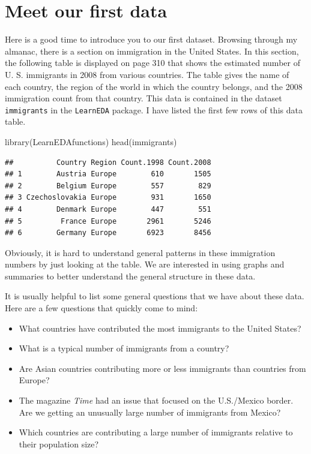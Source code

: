 \documentclass[
]{book}
\newenvironment{Shaded}{\begin{snugshade}}{\end{snugshade}}
\newcommand{\FunctionTok}[1]{\textcolor[rgb]{0.00,0.00,0.00}{#1}}
\newcommand{\NormalTok}[1]{#1}
\providecommand{\tightlist}{%
  \setlength{\itemsep}{0pt}\setlength{\parskip}{0pt}}
\begin{document}
\hypertarget{meet-our-first-data}{%
\section{Meet our first data}\label{meet-our-first-data}}

Here is a good time to introduce you to our first dataset. Browsing through my almanac, there is a section on immigration in the United States. In this section, the following table is displayed on page 310 that shows the estimated number of U. S. immigrants in 2008 from various countries. The table gives the name of each country, the region of the world in which the country belongs, and the 2008 immigration count from that country. This data is contained in the dataset \texttt{immigrants} in the \texttt{LearnEDA} package. I have listed the first few rows of this data table.

\begin{Shaded}
\begin{Highlighting}[]
\FunctionTok{library}\NormalTok{(LearnEDAfunctions)}
\FunctionTok{head}\NormalTok{(immigrants)}
\end{Highlighting}
\end{Shaded}

\begin{verbatim}
##          Country Region Count.1998 Count.2008
## 1        Austria Europe        610       1505
## 2        Belgium Europe        557        829
## 3 Czechoslovakia Europe        931       1650
## 4        Denmark Europe        447        551
## 5         France Europe       2961       5246
## 6        Germany Europe       6923       8456
\end{verbatim}

Obviously, it is hard to understand general patterns in these immigration numbers by just looking at the table. We are interested in using graphs and summaries to better understand the general structure in these data.

It is usually helpful to list some general questions that we have about these data. Here are a few questions that quickly come to mind:

\begin{itemize}
\tightlist
\item
  What countries have contributed the most immigrants to the United States?
\item
  What is a typical number of immigrants from a country?
\item
  Are Asian countries contributing more or less immigrants than countries from Europe?
\item
  The magazine \emph{Time} had an issue that focused on the U.S./Mexico border. Are we getting an unusually large number of immigrants from Mexico?
\item
  Which countries are contributing a large number of immigrants relative to their population size?
\end{itemize}
\end{document}
